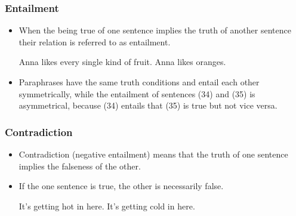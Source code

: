 \documentclass[12pt, table]{beamer}
\begin{document}
\begin{frame}
\frametitle{Entailment}
\begin{itemize}
\item When the being true of one sentence implies the truth of another sentence their relation is referred to as entailment.
\begin{exe} 
\ex Anna likes every single kind of fruit. 
\ex Anna likes oranges.
\end{exe}	
\item Paraphrases have the same truth conditions and entail each other symmetrically, while the entailment of sentences (34) and (35) is asymmetrical, because (34) entails that (35) is true but not vice versa.
\end{itemize}
\end{frame}

\begin{frame}
\frametitle{Contradiction}
\begin{itemize}
\item Contradiction (negative entailment) means that the truth of one sentence implies the falseness of the other.
\item If the one sentence is true, the other is necessarily  false.
\begin{exe} 
\ex It's getting hot in here. 
\ex It's getting cold in here.
\end{exe}	
\end{itemize}
\end{frame}
\end{document}
